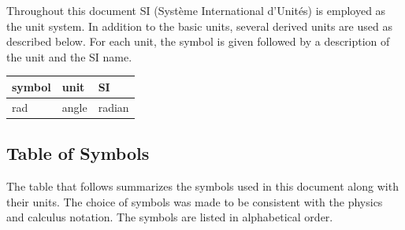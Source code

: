 \documentclass[12pt]{article}
\begin{document}
Throughout this document SI (Syst\`{e}me International d'Unit\'{e}s) is employed
as the unit system.  In addition to the basic units, several derived units are
used as described below.  For each unit, the symbol is given followed by a
description of the unit and the SI name.
~\newline

\renewcommand{\arraystretch}{1.2}
  \noindent \begin{tabular}{l l l} 
    \toprule		
    \textbf{symbol} & \textbf{unit} & \textbf{SI}\\
    \midrule 
    \si{\radian} & angle & radian\\
    \bottomrule
  \end{tabular}


\subsection{Table of Symbols}

The table that follows summarizes the symbols used in this document along with
their units.  The choice of symbols was made to be consistent with the physics 
and calculus 
notation. The symbols are listed in alphabetical order.
\end{document}
